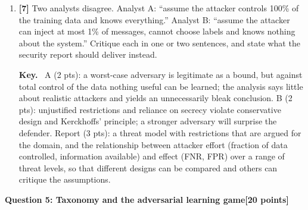 \documentclass[10pt,a4paper]{extarticle}
\newcommand{\question}[3]{%
  \bigskip
  \begin{tcolorbox}[colback=navy!6, colframe=navy, boxrule=0.6pt, arc=1pt,
                    left=5pt, right=5pt, top=2pt, bottom=2pt]
    \textbf{\color{navy}Question #1: #2}\hfill\textbf{\color{accent}[#3 points]}
  \end{tcolorbox}\nopagebreak[4]}
\newcommand{\pts}[1]{\textbf{\color{accent}[#1]}\enspace}
\newenvironment{sol}{\par\smallskip
    \begin{tcolorbox}[colback=accent!6, colframe=accent, boxrule=0.5pt, arc=1pt,
                      left=5pt, right=5pt, top=2pt, bottom=2pt, breakable, fontupper=\small]
    \textbf{\color{accent}Key.}\ }{\end{tcolorbox}\par}
\begin{document}
\begin{enumerate}[label=(\alph*)]
\item \pts{7} Two analysts disagree. Analyst A: ``assume the attacker controls 100\% of the training data and knows everything.'' Analyst B: ``assume the attacker can inject at most 1\% of messages, cannot choose labels and knows nothing about the system.'' Critique each in one or two sentences, and state what the security report should deliver instead.

\begin{sol}
A (2 pts): a worst-case adversary is legitimate as a bound, but against total control of the data nothing useful can be learned; the analysis says little about realistic attackers and yields an unnecessarily bleak conclusion. B (2 pts): unjustified restrictions and reliance on secrecy violate conservative design and Kerckhoffs' principle; a stronger adversary will surprise the defender. Report (3 pts): a threat model with restrictions that are argued for the domain, and the relationship between attacker effort (fraction of data controlled, information available) and effect (FNR, FPR) over a range of threat levels, so that different designs can be compared and others can critique the assumptions.
\end{sol}
\end{enumerate}

\question{5}{Taxonomy and the adversarial learning game}{20}
\end{document}
